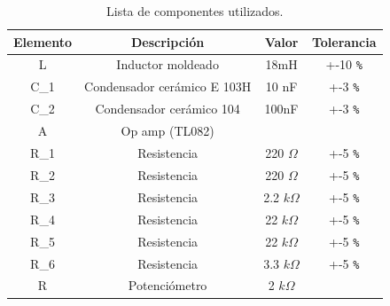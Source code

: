 \documentclass{rbf}
\begin{document}
\begin{table}[]
    \centering
    \caption{Lista de componentes utilizados.} 
    \hline
    \label{tab:valores componentes electricos}
    \begin{tabular}{c|c|c|c}
     Elemento & Descripción & Valor & Tolerancia  \\
     \hline
     L & Inductor moldeado & 18mH & +-10 \verb+%+ \\
     C_1 & Condensador cerámico E 103H & 10 nF & +-3 \verb+%+ \\
     C_2 & Condensador cerámico 104 & 100nF & +-3 \verb+%+  \\
     A & Op amp (TL082) &  &   \\
     R_1 & Resistencia & 220 $Ω$ & +-5 \verb+%+ \\
     R_2 & Resistencia & 220 $Ω$ & +-5 \verb+%+ \\
     R_3 & Resistencia & 2.2 $kΩ$ & +-5 \verb+%+ \\
     R_4 & Resistencia & 22 $kΩ$ & +-5 \verb+%+ \\
     R_5 & Resistencia & 22 $kΩ$ & +-5 \verb+%+ \\
     R_6 & Resistencia & 3.3 $kΩ$ & +-5 \verb+%+ \\
     R & Potenciómetro & 2 $kΩ$ & \\
    \hline
    \end{tabular}
\end{table}

\end{document}

